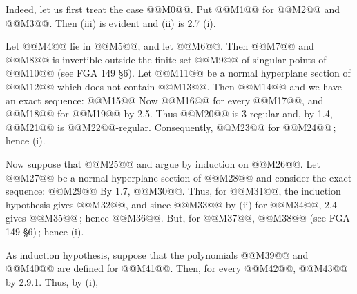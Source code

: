 Indeed, let us first treat the case @@M0@@. Put @@M1@@ for @@M2@@ and @@M3@@. Then (iii) is evident and (ii) is 2.7 (i).

Let @@M4@@ lie in @@M5@@, and let @@M6@@. Then @@M7@@ and @@M8@@ is invertible outside the finite set @@M9@@ of singular points of @@M10@@ (see FGA 149 \S 6). Let @@M11@@ be a normal hyperplane section of @@M12@@ which does not contain @@M13@@. Then @@M14@@ and we have an exact sequence:
@@M15@@
Now @@M16@@ for every @@M17@@, and @@M18@@ for @@M19@@ by 2.5. Thus @@M20@@ is 3-regular and, by 1.4, @@M21@@ is @@M22@@-regular. Consequently, @@M23@@ for @@M24@@\,; hence (i).

Now suppose that @@M25@@ and argue by induction on @@M26@@. Let @@M27@@ be a normal hyperplane section of @@M28@@ and consider the exact sequence:
@@M29@@
By 1.7, @@M30@@. Thus, for @@M31@@, the induction hypothesis gives @@M32@@, and since @@M33@@ by (ii) for @@M34@@, 2.4 gives @@M35@@\,; hence @@M36@@. But, for @@M37@@, @@M38@@ (see FGA 149 \S 6)\,; hence (i).

As induction hypothesis, suppose that the polynomials @@M39@@ and @@M40@@ are defined for @@M41@@. Then, for every @@M42@@, @@M43@@ by 2.9.1. Thus, by (i),
